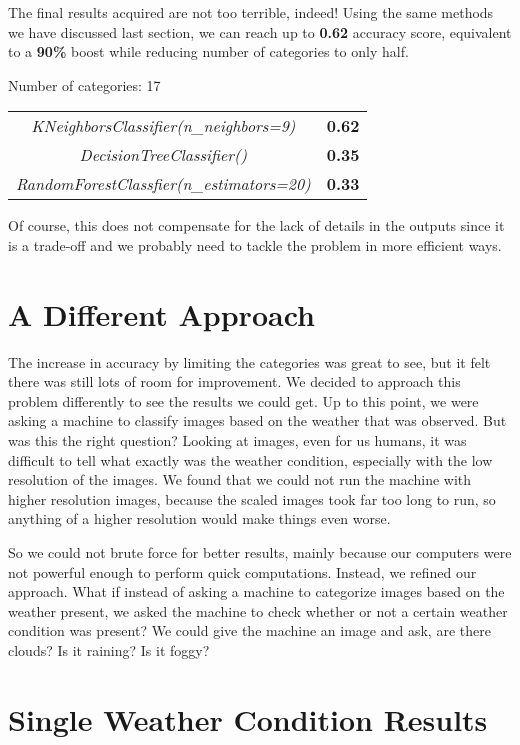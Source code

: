 The final results acquired are not too terrible, indeed! Using the same methods we have discussed last section, we can reach up to \textbf{0.62} accuracy score, equivalent to a \textbf{90\%} boost while reducing number of categories to only half.

\begin{table} [h]
\centering
Number of categories: 17 \\

\begin{tabular}{c|c} 
    \textit{KNeighborsClassifier(n\_neighbors=9)} & \textbf{0.62} \\
    \textit{DecisionTreeClassifier()} & \textbf{0.35} \\
    \textit{RandomForestClassfier(n\_estimators=20)} & \textbf{0.33}
\end{tabular}

\end{table}

Of course, this does not compensate for the lack of details in the outputs since it is a trade-off and we probably need to tackle the problem in more efficient ways.

\section{A Different Approach}
The increase in accuracy by limiting the categories was great to see, but it felt there was still lots of room for improvement. We decided to approach this problem differently to see the results we could get. Up to this point, we were asking a machine to classify images based on the weather that was observed. But was this the right question? Looking at images, even for us humans, it was difficult to tell what exactly was the weather condition, especially with the low resolution of the images. We found that we could not run the machine with higher resolution images, because the scaled images took far too long to run, so anything of a higher resolution would make things even worse.

So we could not brute force for better results, mainly because our computers were not powerful enough to perform quick computations. Instead, we refined our approach. What if instead of asking a machine to categorize images based on the weather present, we asked the machine to check whether or not a certain weather condition was present? We could give the machine an image and ask, are there clouds? Is it raining? Is it foggy?

\section{Single Weather Condition Results}

